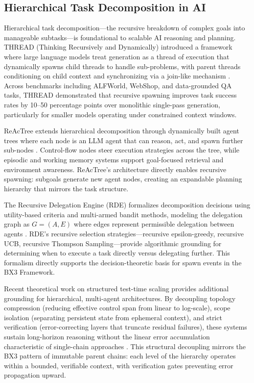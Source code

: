 \subsection{Hierarchical Task Decomposition in AI}

Hierarchical task decomposition---the recursive breakdown of complex goals into manageable subtasks---is foundational to scalable AI reasoning and planning. THREAD (Thinking Recursively and Dynamically) introduced a framework where large language models treat generation as a thread of execution that dynamically spawns child threads to handle sub-problems, with parent threads conditioning on child context and synchronizing via a join-like mechanism \cite{thread}. Across benchmarks including ALFWorld, WebShop, and data-grounded QA tasks, THREAD demonstrated that recursive spawning improves task success rates by 10--50 percentage points over monolithic single-pass generation, particularly for smaller models operating under constrained context windows.

ReAcTree extends hierarchical decomposition through dynamically built agent trees where each node is an LLM agent that can reason, act, and spawn further sub-nodes \cite{reactree}. Control-flow nodes steer execution strategies across the tree, while episodic and working memory systems support goal-focused retrieval and environment awareness. ReAcTree's architecture directly enables recursive spawning: subgoals generate new agent nodes, creating an expandable planning hierarchy that mirrors the task structure.

The Recursive Delegation Engine (RDE) formalizes decomposition decisions using utility-based criteria and multi-armed bandit methods, modeling the delegation graph as $G = (A, E)$ where edges represent permissible delegation between agents \cite{rde}. RDE's recursive selection strategies---recursive epsilon-greedy, recursive UCB, recursive Thompson Sampling---provide algorithmic grounding for determining when to execute a task directly versus delegating further. This formalism directly supports the decision-theoretic basis for spawn events in the BX3 Framework.

Recent theoretical work on structured test-time scaling provides additional grounding for hierarchical, multi-agent architectures. By decoupling topology compression (reducing effective control span from linear to log-scale), scope isolation (separating persistent state from ephemeral context), and strict verification (error-correcting layers that truncate residual failures), these systems sustain long-horizon reasoning without the linear error accumulation characteristic of single-chain approaches \cite{test-time-scaling}. This structural decoupling mirrors the BX3 pattern of immutable parent chains: each level of the hierarchy operates within a bounded, verifiable context, with verification gates preventing error propagation upward.

